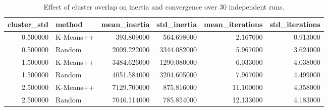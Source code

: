 \begin{table}
\caption{Effect of cluster overlap on inertia and convergence over 30 independent runs.}
\label{tab:overlap_summary}
\begin{tabular}{rlrrrr}
\toprule
cluster_std & method & mean_inertia & std_inertia & mean_iterations & std_iterations \\
\midrule
0.500000 & K-Means++ & 393.809000 & 564.698000 & 2.167000 & 0.913000 \\
0.500000 & Random & 2009.222000 & 3344.082000 & 5.967000 & 3.624000 \\
1.500000 & K-Means++ & 3484.626000 & 1290.080000 & 6.033000 & 4.038000 \\
1.500000 & Random & 4051.584000 & 3204.605000 & 7.967000 & 4.499000 \\
2.500000 & K-Means++ & 7129.700000 & 875.816000 & 11.100000 & 4.358000 \\
2.500000 & Random & 7046.114000 & 785.854000 & 12.133000 & 4.183000 \\
\bottomrule
\end{tabular}
\end{table}
